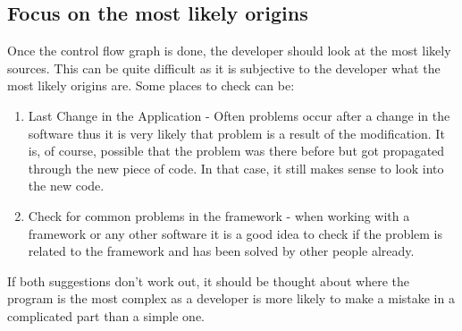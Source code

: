 \subsection{Focus on the most likely origins}
Once the control flow graph is done, the developer should look at the most likely sources. This can be quite difficult as it is subjective to the developer what the most likely origins are. Some places to check can be:
\begin{enumerate}
  \item Last Change in the Application - Often problems occur after a change in the software thus it is very likely that problem is a result of the modification. It is, of course, possible that the problem was there before but got propagated through the new piece of code. In that case, it still makes sense to look into the new code.
  \item Check for common problems in the framework - when working with a framework or any other software it is a good idea to check if the problem is related to the framework and has been solved by other people already.
\end{enumerate}
If both suggestions don't work out, it should be thought about where the program is the most complex as a developer is more likely to make a mistake in a complicated part than a simple one.


